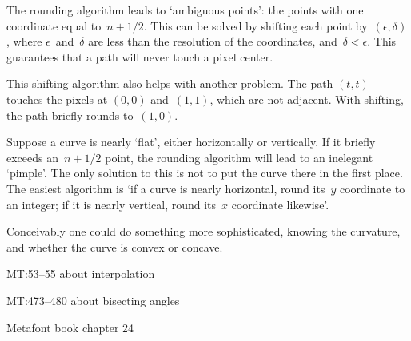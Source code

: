 The rounding algorithm leads to `ambiguous points': the points with
one coordinate equal to~$n+1/2$. This can be solved by shifting each
point by~$(\epsilon,\delta)$, where $\epsilon$~and~$\delta$ are less
than the resolution of the coordinates, and~$\delta<\epsilon$. This
guarantees that a path will never touch a pixel center.

This shifting algorithm also helps with another problem. The path
$(t,t)$ touches the pixels at $(0,0)$ and~$(1,1)$, which are not
adjacent. With shifting, the path briefly rounds to~$(1,0)$.

Suppose a curve is nearly `flat', either horizontally or
vertically. If it briefly exceeds an~$n+1/2$ point, the rounding
algorithm will lead to an inelegant `pimple'. The only solution to
this is not to put the curve there in the first place. The easiest
algorithm is `if a curve is nearly horizontal, round its~$y$
coordinate to an integer; if it is nearly vertical, round its~$x$
coordinate likewise'.

Conceivably one could do something more sophisticated, knowing the
curvature, and whether the curve is convex or concave.


MT:53--55 about interpolation

MT:473--480 about bisecting angles

Metafont book chapter 24
